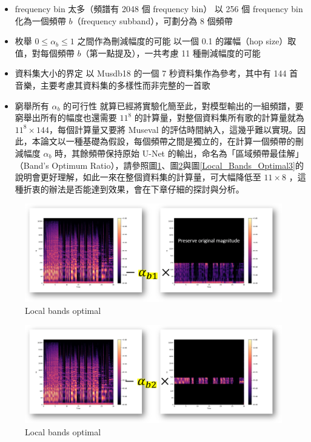 \begin{itemize}
    \item[1.] frequency bin 太多（頻譜有 2048 個 frequency bin）
        \subitem 以 256 個 frequency bin 化為一個頻帶 $b$（frequency subband），可劃分為 8 個頻帶
    \item[2.] 枚舉 $0\leq\alpha_b\leq1$ 之間作為刪減幅度的可能
        \subitem 以一個 0.1 的躍幅（hop size）取值，對每個頻帶 $b$（第一點提及），一共考慮 11 種刪減幅度的可能
    \item[3.] 資料集大小的界定
        \subitem 以 Musdb18 的一個 7 秒資料集作為參考，其中有 144 首音樂，主要考慮其資料集的多樣性而非完整的一首歌
    \item[4.] 窮舉所有 $\alpha_b$ 的可行性
        \subitem 就算已經將實驗化簡至此，對模型輸出的一組頻譜，要窮舉出所有的幅度也還需要 $11^8$ 的計算量，對整個資料集所有歌的計算量就為 $11^8\times144$，每個計算量又要將 Museval 的評估時間納入，這幾乎難以實現。因此，本論文以一種基礎為假設，每個頻帶之間是獨立的，在計算一個頻帶的刪減幅度 $\alpha_b$ 時，其餘頻帶保持原始 U-Net 的輸出，命名為「區域頻帶最佳解」（Band’s Optimum Ratio），請參照圖\ref{Bands_Optimum_Ratio}、圖\ref{Bands_Optimum_Ratio2}與圖\ref{Local_Bands_Optimal3}的說明會更好理解，如此一來在整個資料集的計算量，可大幅降低至 $11\times8$ ，這種折衷的辦法是否能達到效果，會在下章仔細的探討與分析。
\end{itemize}
\begin{figure}[htbp]
    \hfil
    \begin{minipage}[t]{0.65\textwidth}
        \includegraphics[width=\textwidth]{./figures/chapter04_experiment/Local_Bands_Optimal1.png}
        \caption {Local bands optimal}
        \label{Bands_Optimum_Ratio}
    \end{minipage}
    \hfil
\end{figure}
\begin{figure}[htbp]
    \hfil
    \begin{minipage}[t]{0.65\textwidth}
        \includegraphics[width=\textwidth]{./figures/chapter04_experiment/Local_Bands_Optimal2.png}
        \caption {Local bands optimal}
        \label{Bands_Optimum_Ratio2}
    \end{minipage}
    \hfil
\end{figure}
